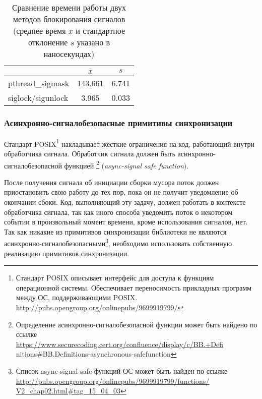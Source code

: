 \begin{table}[h!]
\caption{Сравнение времени работы двух методов блокирования сигналов (среднее время $\bar{x}$ 
и стандартное отклонение $s$ указано в наносекундах)}
\label{table:siglock}
\begin{center}
\begin{tabular}{|l|c|c|}
\hline
                            & $\bar{x}$    & $s$       \\ \hline
pthread\_sigmask            & 143.661      & 6.741     \\ \hline
siglock/sigunlock           & 3.965        & 0.033     \\ \hline
\end{tabular}
\end{center}
\end{table}


\subsubsection{Асинхронно-сигналобезопасные примитивы синхронизации}
Стандарт POSIX\footnote{Стандарт POSIX описывает интерфейс для доступа к функциям 
операционной системы. 
Обеспечивает переносимость прикладных программ между ОС, поддерживающими POSIX. \\
\url{http://pubs.opengroup.org/onlinepubs/9699919799/}} 
накладывает жёсткие ограничения на код, работающий внутри обработчика сигнала. 
Обработчик сигнала должен быть асинхронно-сигналобезопасной функцией 
\footnote{Определение асинхронно-сигналобезопасной функции 
может быть найдено по ссылке\\ \url{https://www.securecoding.cert.org/confluence/display/c/BB.+Defi}\\{nitions\#BB.Definitions-asynchronous-safefunction}}
(\emph{async-signal safe function}). 

После получения сигнала об инициации сборки мусора поток должен приостановить свою работу 
до тех пор, пока он не получит уведомление об окончании сбоки. 
Код, выполняющий эту задачу, должен работать в контексте обработчика сигнала, так как иного 
способа уведомить поток о некотором событии в произвольный момент времени, кроме использования сигналов, нет. 
Так как никакие из примитивов синхронизации библиотеки  не являются 
асинхронно-сигналобезопасными\footnote{Список async-signal safe функций ОС  может 
быть найден по ссылке\\ \url{http://pubs.opengroup.org/onlinepubs/9699919799/functions/
V2\_chap02.html\#tag\_15\_04\_03}}, 
необходимо использовать собственную реализацию примитивов синхронизации.

